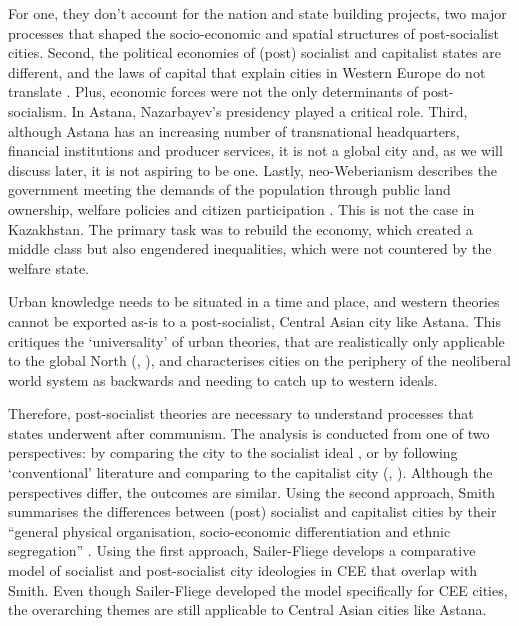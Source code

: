 \documentclass{article}
\begin{document}
For one, they don't account for the nation and state building projects, two major processes that shaped the socio-economic and spatial structures of post-socialist cities.
Second, the political economies of (post) socialist and capitalist states are different, and the laws of capital that explain cities in Western Europe do not translate \parencite{hirt2013whatever}. Plus, economic forces were not the only determinants of post-socialism. In Astana, Nazarbayev's presidency played a critical role.
Third, although Astana has an increasing number of transnational headquarters, financial institutions and producer services, it is not a global city and, as we will discuss later, it is not aspiring to be one.
Lastly, neo-Weberianism describes the government meeting the demands of the population through public land ownership, welfare policies and citizen participation \parencite{haussermann2005european}. This is not the case in Kazakhstan. The primary task was to rebuild the economy, which created a middle class but also engendered inequalities, which were not countered by the welfare state.

Urban knowledge needs to be situated in a time and place, and western theories cannot be exported as-is to a post-socialist, Central Asian city like Astana. This critiques the `universality' of urban theories, that are realistically only applicable to the global North (\cite{ferenvcuhova2016accounts}, \cite{robinson2013ordinary}), and characterises cities on the periphery of the neoliberal world system as backwards and needing to catch up to western ideals.

Therefore, post-socialist theories are necessary to understand processes that states underwent after communism. The analysis is conducted from one of two perspectives: by comparing the city to the socialist ideal \parencite{sailer1999characteristics}, or by following `conventional' literature and comparing to the capitalist city (\cite{smith1996socialist}, \cite{haussermann1996socialist}). Although the perspectives differ, the outcomes are similar. Using the second approach, Smith summarises the differences between (post) socialist and capitalist cities by their ``general physical organisation, socio-economic differentiation and ethnic segregation'' \parencite{smith1996socialist}. Using the first approach, Sailer-Fliege develops a comparative model of socialist and post-socialist city ideologies in CEE that overlap with Smith. Even though Sailer-Fliege developed the model specifically for CEE cities, the overarching themes are still applicable to Central Asian cities like Astana.
\end{document}
